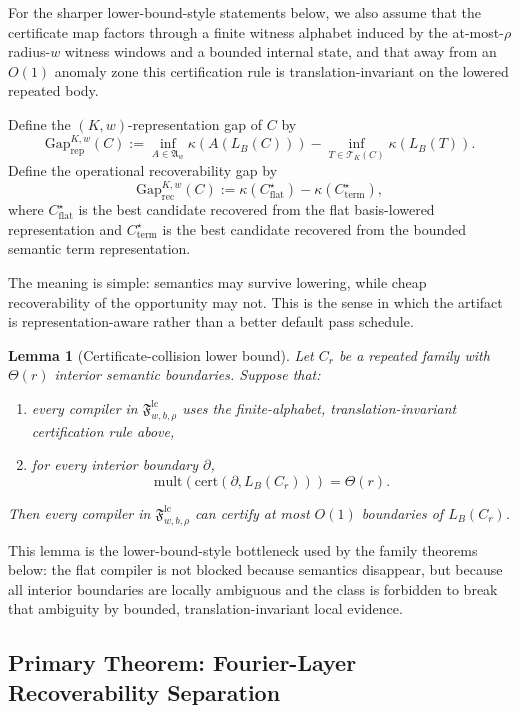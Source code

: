 \documentclass[11pt]{article}
\newtheorem{lemma}{Lemma}
\begin{document}
For the sharper lower-bound-style statements below, we also assume that the
certificate map factors through a finite witness alphabet induced by the
at-most-$\rho$ radius-$w$ witness windows and a bounded internal state, and
that away from an $O(1)$ anomaly zone this certification rule is
translation-invariant on the lowered repeated body.

Define the $(K,w)$-representation gap of $C$ by
\[
\mathrm{Gap}^{K,w}_{\mathrm{rep}}(C)
:=
\inf_{A \in \mathfrak{A}_w} \kappa(A(L_B(C)))
-
\inf_{T \in \mathcal{T}_K(C)} \kappa(L_B(T)).
\]
Define the operational recoverability gap by
\[
\mathrm{Gap}^{K,w}_{\mathrm{rec}}(C)
:=
\kappa(C_{\mathrm{flat}}^\star) - \kappa(C_{\mathrm{term}}^\star),
\]
where $C_{\mathrm{flat}}^\star$ is the best candidate recovered from the flat
basis-lowered representation and $C_{\mathrm{term}}^\star$ is the best candidate
recovered from the bounded semantic term representation.

The meaning is simple: semantics may survive lowering, while cheap
recoverability of the opportunity may not. This is the sense in which the
artifact is representation-aware rather than a better default pass schedule.

\begin{lemma}[Certificate-collision lower bound]
\label{lem:certificate-collision}
Let $C_r$ be a repeated family with $\Theta(r)$ interior semantic boundaries.
Suppose that:
\begin{enumerate}[leftmargin=1.5em]
    \item every compiler in $\mathfrak{F}^{\mathrm{lc}}_{w,b,\rho}$ uses the finite-alphabet, translation-invariant certification rule above,
    \item for every interior boundary $\partial$,
\[
\mathrm{mult}(\mathrm{cert}(\partial, L_B(C_r))) = \Theta(r).
\]
\end{enumerate}
Then every compiler in $\mathfrak{F}^{\mathrm{lc}}_{w,b,\rho}$ can certify at
most $O(1)$ boundaries of $L_B(C_r)$.
\end{lemma}

This lemma is the lower-bound-style bottleneck used by the family theorems
below: the flat compiler is not blocked because semantics disappear, but
because all interior boundaries are locally ambiguous and the class is
forbidden to break that ambiguity by bounded, translation-invariant local
evidence.

\subsection{Primary Theorem: Fourier-Layer Recoverability Separation}
\end{document}
